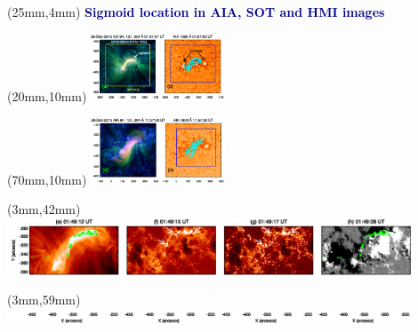 \documentclass{beamer}
\begin{document}
\begin{frame}
 
 
 
% 

\begin{textblock*}{80mm}(25mm,4mm)
\small \bf \textcolor{darkblue}{Sigmoid location in AIA, SOT and HMI images}
 \end{textblock*}

\begin{textblock*}{70mm}(20mm,10mm)
\includegraphics[height = 20mm, width = 40mm]{figs/sig1}
\end{textblock*}
\begin{textblock*}{70mm}(70mm,10mm)
\includegraphics[height = 20mm, width = 40mm]{figs/sig2}
\end{textblock*}

\begin{textblock*}{200mm}(3mm,42mm)
\includegraphics[height = 17mm, width = 120mm]{figs/sig3}
\end{textblock*}
\begin{textblock*}{200mm}(3mm,59mm)
\includegraphics[height = 5mm, width = 120mm]{figs/sig4}
\end{textblock*} 


\end{frame}
\end{document}
